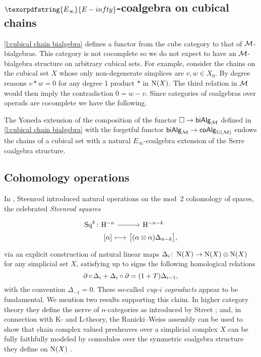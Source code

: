 \subsection{$\texorpdfstring{E_\infty}{E-infty}$-coalgebra on cubical chains}

\cref{l:cubical chain bialgebra} defines a functor from the cube category to that of $\mathcal{M}$-bialgebras.
This category is not cocomplete so we do not expect to have an $\mathcal{M}$-bialgebra structure on arbitrary cubical sets.
For example, consider the chains on the cubical set $X$ whose only non-degenerate simplices are $v, w \in X_0$.
By degree reasons $v \ast w = 0$ for any degree 1 product $\ast$ in $\operatorname{N}(X)$.
The third relation in $\mathcal{M}$ would then imply the contradiction $0 = w-v$.
Since categories of coalgebras over operads are cocomplete we have the following.

\begin{theorem} \label{t:lift to e infinity coalgebras}
	The Yoneda extension of the composition of the functor $\square \to \mathsf{biAlg}_{\mathcal{M}}$ defined in \cref{l:cubical chain bialgebra} with the forgetful functor $\mathsf{biAlg}_{\mathcal{M}} \to \mathsf{coAlg}_{{\operatorname{U}(\mathcal{M})}}$ endows the chains of a cubical set with a natural $E_\infty$-coalgebra extension of the Serre coalgebra structure.
\end{theorem}

\subsection{Cohomology operations}

In \cite{steenrod1947products}, Steenrod introduced natural operations on the mod~2 cohomology of spaces, the celebrated \textit{Steenrod squares}
\[
\begin{tikzcd} [column sep=small, row sep=0]
	\Sq^k \colon &[-20] \rH^{-n} \arrow[r] & \rH^{-n-k} \\ &
	{[\alpha]} \arrow[r, mapsto] & \big[ (\alpha \ot \alpha) \Delta_{n-k} \big],
\end{tikzcd}
\]
via an explicit construction of natural linear maps $\Delta_i \colon \operatorname{N}(X) \to \operatorname{N}(X) \otimes \operatorname{N}(X)$ for any simplicial set $X$, satisfying up to signs the following homological relations
\begin{equation} \label{e:cupi homological relations}
\operatorname{\partial} \circ \, \Delta_i + \Delta_i \circ \operatorname{\partial} =
(1 + T) \Delta_{i-1},
\end{equation}
with the convention $\Delta_{-1} = 0$.
These so-called \textit{cup-$i$ coproducts} appear to be fundamental.
We mention two results supporting this claim.
In higher category theory they define the nerve of $n$-categories \cite{medina2020globular} as introduced by Street \cite{street1987orientals}; and, in connection with K- and L-theory, the Ranicki--Weiss assembly \cite{ranicki1990assembly} can be used to show that chain complex valued presheaves over a simplicial complex $X$ can be fully faithfully modeled by comodules over the symmetric coalgebra structure they define on $\operatorname{N}(X)$ \cite{medina2022assembly}.

